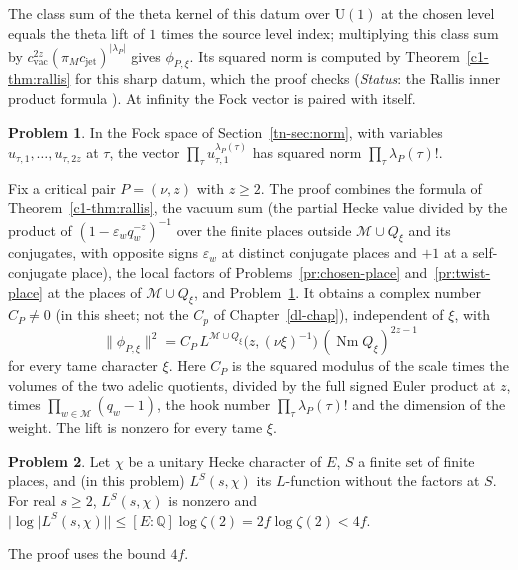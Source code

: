 \documentclass[reqno]{amsart}
\newcounter{chap}
\theoremstyle{definition}
\newtheorem{problem}{Problem}[section]
\theoremstyle{plain}
\theoremstyle{remark}
\newcommand{\Q}{\mathbb{Q}}
\newcommand{\Mcal}{\mathcal{M}}
\newcommand{\Nm}{\operatorname{Nm}}
\newcommand{\cvac}{c_{\mathrm{vac}}}
\newcommand{\cjet}{c_{\mathrm{jet}}}
\begin{document}
The class sum of the theta kernel of this datum over \(\mathrm U(1)\) at the chosen level equals the theta lift of \(1\) times the source level index; multiplying this class sum by \(\cvac^{2z}(\pi_M\cjet)^{\lvert\lambda_P\rvert}\) gives \(\phi_{P,\xi}\).  Its squared norm is computed by Theorem~\ref{c1-thm:rallis} for this sharp datum, which the proof checks (\emph{Status}: the Rallis inner product formula \cite{Ra,Li}).  At infinity the Fock vector is paired with itself.

\begin{problem}\label{pr:fock-row}
In the Fock space of Section~\ref{tn-sec:norm}, with variables \(u_{\tau,1},\dots,u_{\tau,2z}\) at \(\tau\), the vector \(\prod_\tau u_{\tau,1}^{\lambda_P(\tau)}\) has squared norm \(\prod_\tau \lambda_P(\tau)!\).
\end{problem}

Fix a critical pair \(P = (\nu, z)\) with \(z \ge 2\).  The proof combines the formula of Theorem~\ref{c1-thm:rallis}, the vacuum sum (the partial Hecke value divided by the product of \((1-\varepsilon_w q_w^{-z})^{-1}\) over the finite places outside \(\Mcal\cup Q_\xi\) and its conjugates, with opposite signs \(\varepsilon_w\) at distinct conjugate places and \(+1\) at a self-conjugate place), the local factors of Problems~\ref{pr:chosen-place} and~\ref{pr:twist-place} at the places of \(\Mcal \cup Q_\xi\), and Problem~\ref{pr:fock-row}.  It obtains a complex number \(C_P \ne 0\) (in this sheet; not the \(C_p\) of Chapter~\ref{dl-chap}), independent of \(\xi\), with
\[
  \lVert\phi_{P,\xi}\rVert^2 = C_P\, L^{\Mcal\cup Q_\xi}\bigl(z, (\nu\xi)^{-1}\bigr)\,(\Nm Q_\xi)^{2z-1}
\]
for every tame character \(\xi\).  Here \(C_P\) is the squared modulus of the scale times the volumes of the two adelic quotients, divided by the full signed Euler product at \(z\), times \(\prod_{w\in\Mcal}(q_w - 1)\), the hook number \(\prod_\tau\lambda_P(\tau)!\) and the dimension of the weight.  The lift is nonzero for every tame \(\xi\).

\begin{problem}\label{pr:euler-size}
Let \(\chi\) be a unitary Hecke character of \(E\), \(S\) a finite set of finite places, and (in this problem) \(L^S(s,\chi)\) its \(L\)-function without the factors at \(S\).  For real \(s \ge 2\), \(L^S(s,\chi)\) is nonzero and \(\lvert\log\lvert L^S(s,\chi)\rvert\rvert \le [E:\Q]\log\zeta(2) = 2f\log\zeta(2) < 4f\).
\end{problem}

The proof uses the bound \(4f\).
\end{document}
